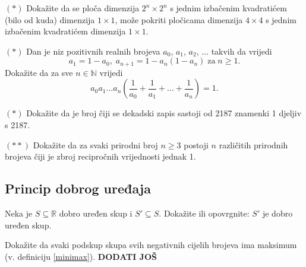 \begin{exercise} $(*)$
Dokažite da se ploča dimenzija $2^n\times 2^n$ s jednim izbačenim kvadratićem (bilo od kuda) dimenzija $1\times 1$, može pokriti pločicama dimenzija $4\times 4$ s jednim izbačenim kvadratićem dimenzija $1\times 1$.
\end{exercise}
\begin{exercise} $(*)$
Dan je niz pozitivnih realnih brojeva $a_0$, $a_1$, $a_2$, $\dots$ takvih da vrijedi
$$a_1=1-a_0,\; a_{n+1}=1-a_n(1-a_n) \; \mathrm{za} \; n\geq 1.$$
Dokažite da za sve $n\in \mathbb{N}$ vrijedi
$$a_0a_1\dots a_n\left(\dfrac{1}{a_0}+\dfrac{1}{a_1}+\dots+ \dfrac{1}{a_n}\right)=1.$$
\end{exercise}
\begin{exercise} $(*)$
Dokažite da je broj čiji se dekadski zapis sastoji od 2187 znamenki 1 djeljiv s 2187.
\end{exercise}
\begin{exercise} $(**)$
Dokažite da za svaki prirodni broj $n\geq 3$ postoji $n$ različitih prirodnih brojeva čiji je zbroj recipročnih vrijednosti jednak 1.
\end{exercise}

\subsection*{Princip dobrog uređaja}
\begin{exercise}
Neka je $S\subseteq \mathbb{R}$ dobro uređen skup i $S'\subseteq S$. Dokažite ili opovrgnite: $S'$ je dobro uređen skup.
\end{exercise}
\begin{exercise}
Dokažite da svaki podskup skupa svih negativnih cijelih brojeva ima maksimum (v. definiciju \ref{minimax}).
\textbf{DODATI JOŠ}
\end{exercise}
